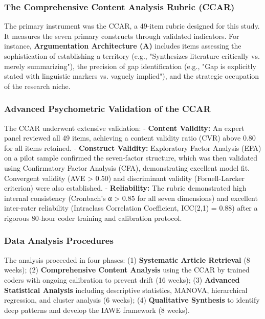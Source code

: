 \documentclass[journal,article,submit,pdftex,moreauthors]{Definitions/mdpi}
\begin{document}
\subsubsection{The Comprehensive Content Analysis Rubric (CCAR)}

The primary instrument was the CCAR, a 49-item rubric designed for this study. It measures the seven primary constructs through validated indicators. For instance, \textbf{Argumentation Architecture (A)} includes items assessing the sophistication of establishing a territory (e.g., "Synthesizes literature critically vs. merely summarizing"), the precision of gap identification (e.g., "Gap is explicitly stated with linguistic markers vs. vaguely implied"), and the strategic occupation of the research niche.

\subsubsection{Advanced Psychometric Validation of the CCAR}

The CCAR underwent extensive validation:
- \textbf{Content Validity:} An expert panel reviewed all 49 items, achieving a content validity ratio (CVR) above 0.80 for all items retained.
- \textbf{Construct Validity:} Exploratory Factor Analysis (EFA) on a pilot sample confirmed the seven-factor structure, which was then validated using Confirmatory Factor Analysis (CFA), demonstrating excellent model fit. Convergent validity (AVE > 0.50) and discriminant validity (Fornell-Larcker criterion) were also established.
- \textbf{Reliability:} The rubric demonstrated high internal consistency (Cronbach's α > 0.85 for all seven dimensions) and excellent inter-rater reliability (Intraclass Correlation Coefficient, ICC(2,1) = 0.88) after a rigorous 80-hour coder training and calibration protocol.

\subsubsection{Data Analysis Procedures}

The analysis proceeded in four phases: (1) \textbf{Systematic Article Retrieval} (8 weeks); (2) \textbf{Comprehensive Content Analysis} using the CCAR by trained coders with ongoing calibration to prevent drift (16 weeks); (3) \textbf{Advanced Statistical Analysis} including descriptive statistics, MANOVA, hierarchical regression, and cluster analysis (6 weeks); (4) \textbf{Qualitative Synthesis} to identify deep patterns and develop the IAWE framework (8 weeks).
\end{document}
